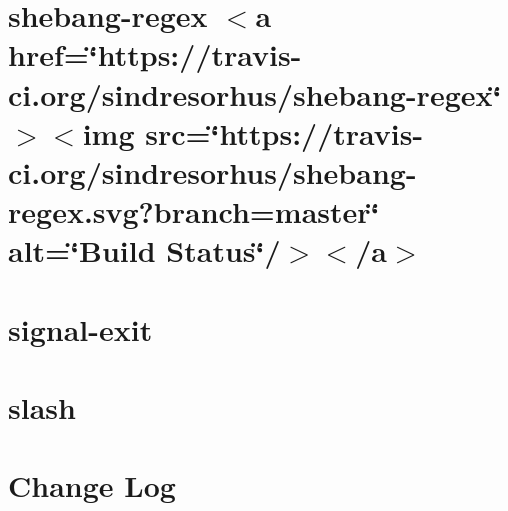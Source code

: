 \documentclass[twoside]{book}
\newcommand{\+}{\discretionary{\mbox{\scriptsize$\hookleftarrow$}}{}{}}
\begin{document}
\chapter{shebang-\/regex \texorpdfstring{$<$}{<}a href=\char`\"{}https\+://travis-\/ci.\+org/sindresorhus/shebang-\/regex\char`\"{} \texorpdfstring{$>$}{>}\texorpdfstring{$<$}{<}img src=\char`\"{}https\+://travis-\/ci.\+org/sindresorhus/shebang-\/regex.\+svg?branch=master\char`\"{} alt=\char`\"{}\+Build Status\char`\"{}/\texorpdfstring{$>$}{>}\texorpdfstring{$<$}{<}/a\texorpdfstring{$>$}{>}}
\label{md__c___users_vaishnavi_jadhav__desktop__developer_code_mean_stack_example_client_node_modules_shebang_regex_readme}

\chapter{signal-\/exit}
\label{md__c___users_vaishnavi_jadhav__desktop__developer_code_mean_stack_example_client_node_modules_signal_exit__r_e_a_d_m_e}

\chapter{slash}
\label{md__c___users_vaishnavi_jadhav__desktop__developer_code_mean_stack_example_client_node_modules_slash_readme}

\chapter{Change Log}
\label{md__c___users_vaishnavi_jadhav__desktop__developer_code_mean_stack_example_client_node_modules_s65d1c69e150e12cb674f0b0e6159f2c9}

\end{document}
